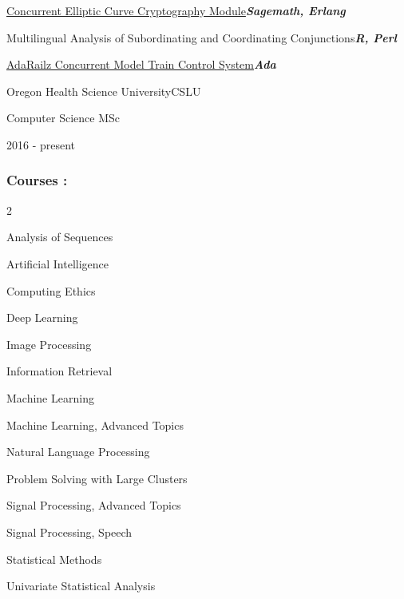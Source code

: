 \documentclass{article}
\newenvironment{mylist}[2]{
  \subsubsection*{#1}
  \begin{multicols}{#2}
  \small
  \begin{list}{}{}
   \setlength{\topsep}{0pt}
   \setlength{\itemsep}{1pt}
   \setlength{\parskip}{0pt}
   \setlength{\parsep}{0pt}}{\end{list}\end{multicols}\normalsize}
\newenvironment{**mylist}[2]{
  \subsubsection*{#1\hfill\small#2}
  \small
  \begin{list}{}{}
    \setlength{\topsep}{0pt}
   \setlength{\itemsep}{1pt}
   \setlength{\parskip}{0pt}
   \setlength{\parsep}{0pt}}{\end{list}\normalsize}
\newenvironment{*mylist}[2]{
  \subsection*{#1\hfill#2}
  \small
  \begin{list}{}{}
   \setlength{\topsep}{0pt}
   \setlength{\itemsep}{1pt}
   \setlength{\parskip}{0pt}
   \setlength{\parsep}{0pt}}{\end{list}\normalsize}
\newcommand{\LUx}[1]{{\bf\em #1}}
\begin{document}
\begin{**mylist}{}{}
\item \href{https://github.com/probinso/ecc}{Concurrent Elliptic Curve Cryptography Module}\hfill\LUx{Sagemath, Erlang}
\item Multilingual Analysis of Subordinating and Coordinating Conjunctions\hfill\LUx{R, Perl}
\item \href{https://github.com/probinso/adarailz}{AdaRailz Concurrent Model Train Control System}\hfill\LUx{Ada}
\end{**mylist}
\normalsize


\begin{*mylist}{Oregon Health Science University}{CSLU}
\item Computer Science MSc
\item 2016 - present%
\end{*mylist}

\begin{mylist}{Courses :}{2}
\item Analysis of Sequences
\item Artificial Intelligence
\item Computing Ethics
\item Deep Learning
\item Image Processing
\item Information Retrieval
\item Machine Learning
\item Machine Learning, Advanced Topics
\item Natural Language Processing
\item Problem Solving with Large Clusters
\item Signal Processing, Advanced Topics
\item Signal Processing, Speech
\item Statistical Methods
\item Univariate Statistical Analysis
\end{mylist}
\end{document}
